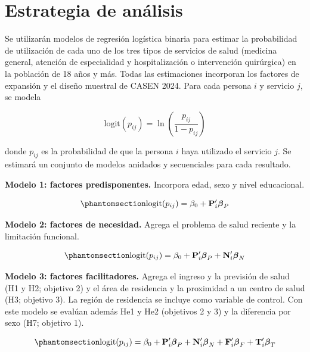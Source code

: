 \documentclass[
  spanish,
  a4paper,
  oneside]{scrbook}
\begin{document}
\section{Estrategia de análisis}\label{estrategia-de-anuxe1lisis}

Se utilizarán modelos de regresión logística binaria para estimar la
probabilidad de utilización de cada uno de los tres tipos de servicios
de salud (medicina general, atención de especialidad y hospitalización o
intervención quirúrgica) en la población de 18 años y más. Todas las
estimaciones incorporan los factores de expansión y el diseño muestral
de CASEN 2024. Para cada persona \(i\) y servicio \(j\), se modela

\[
\text{logit}(p_{ij}) = \ln\left(\frac{p_{ij}}{1-p_{ij}}\right)
\]

donde \(p_{ij}\) es la probabilidad de que la persona \(i\) haya
utilizado el servicio \(j\). Se estimará un conjunto de modelos anidados
y secuenciales para cada resultado.

\textbf{Modelo 1: factores predisponentes.} Incorpora edad, sexo y nivel
educacional.

\begin{equation}\protect\phantomsection\label{eq-m1}{
\text{logit}(p_{ij}) = \beta_0 + \mathbf{P}_i'\boldsymbol{\beta}_P
}\end{equation}

\textbf{Modelo 2: factores de necesidad.} Agrega el problema de salud
reciente y la limitación funcional.

\begin{equation}\protect\phantomsection\label{eq-m2}{
\text{logit}(p_{ij}) = \beta_0 + \mathbf{P}_i'\boldsymbol{\beta}_P + \mathbf{N}_i'\boldsymbol{\beta}_N
}\end{equation}

\textbf{Modelo 3: factores facilitadores.} Agrega el ingreso y la
previsión de salud (H1 y H2; objetivo 2) y el área de residencia y la
proximidad a un centro de salud (H3; objetivo 3). La región de
residencia se incluye como variable de control. Con este modelo se
evalúan además He1 y He2 (objetivos 2 y 3) y la diferencia por sexo (H7;
objetivo 1).

\begin{equation}\protect\phantomsection\label{eq-m3}{
\text{logit}(p_{ij}) = \beta_0 + \mathbf{P}_i'\boldsymbol{\beta}_P + \mathbf{N}_i'\boldsymbol{\beta}_N + \mathbf{F}_i'\boldsymbol{\beta}_F + \mathbf{T}_i'\boldsymbol{\beta}_T
}\end{equation}
\end{document}
